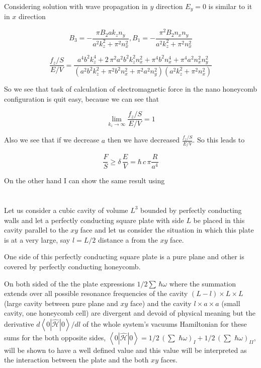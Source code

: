 \documentclass[twoside, 10pt]{article}
\begin{document}
\begin{multicols}{2}
Considering solution with wave propagation in \(y\) direction
\(E_y = 0\) is similar to it in \(x\) direction

    \[B_3 = -\frac{\pi B_{2} a k_{z} n_{y}}{a^{2} k_{z}^{2} + \pi^{2} n_{x}^{2}}, 
B_1 = -\frac{\pi^{2} B_{2} n_{x} n_{y}}{a^{2} k_{z}^{2} + \pi^{2} n_{x}^{2}}\]

\[\frac{f_z/S}{E/V} = \frac{a^{4} b^{2} k_{z}^{4} + 2 \, \pi^{2} a^{2} b^{2} k_{z}^{2} n_{x}^{2} + \pi^{4} b^{2} n_{x}^{4} + \pi^{4} a^{2} n_{x}^{2} n_{y}^{2}}{{\left(a^{2} b^{2} k_{z}^{2} + \pi^{2} b^{2} n_{x}^{2} + \pi^{2} a^{2} n_{y}^{2}\right)} {\left(a^{2} k_{z}^{2} + \pi^{2} n_{x}^{2}\right)}}\]

    So we see that task of calculation of electromagnetic force in the nano
honeycomb configuration is quit easy, because we can see that

\[\lim_{k_z \to \infty}\frac{f_z/S}{E/V} = 1\]

Also we see that if we decrease \(a\) then we have decreased
\(\frac{f_z/S}{E/V}\). So this leads to

\[\frac{F}{S} \geq \delta\,\frac{E}{V} = \hbar\,c\, \pi\frac{R}{a^4}\]

On the other hand I can show the same result using


    \section*{}\label{appendix-c.-hamiltonian-mechanics-approach}
\vspace{-3.5mm}


    Let us consider a cubic cavity of volume \(L^3\) bounded by perfectly
conducting walls and let a perfectly conducting square plate with side
\(L\) be placed in this cavity parallel to the \(xy\) face and let us
consider the situation in which this plate is at a very large, say
\(l = L/2\) distance a from the \(xy\) face.

One side of this perfectly conducting square plate is a pure plane and
other is covered by perfectly conducting honeycomb.

On both sided of the the plate expressions \(1\big/2\sum\,\hbar\omega\)
where the summation extends over all possible resonance frequencies of
the cavity \(\left(L-l\right)\times L\times L\) (large cavity between
pure plane and \(xy\) face) and the cavity \(l\times a\times a\) (small
cavity, one honeycomb cell) are divergent and devoid of physical meaning
but the derivative \({d\left<0|\hat{\mathcal{H}}|0\right>}\big/{dl}\) of
the whole system's vacuums Hamiltonian for these sums for the both
opposite sides,
\(\left<0|\hat{\mathcal{H}}|0\right> = 1\big/2\,\left(\sum\,\,\hbar\omega\right)_{I} + 1\big/2\,\left(\sum\,\,\hbar\omega\right)_{II}\),
will be shown to have a well defined value and this value will be
interpreted as the interaction between the plate and the both \(xy\)
faces.


\end{multicols}
\end{document}
